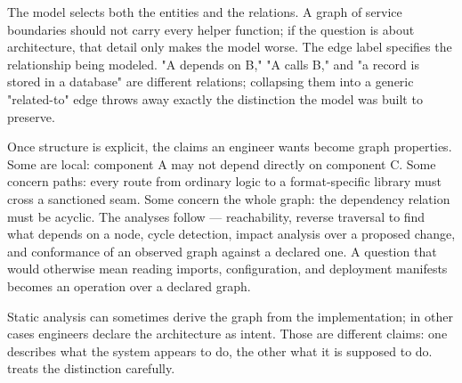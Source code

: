 
The model selects both the entities and the relations. A graph of service boundaries should not carry every helper function; if the question is about architecture, that detail only makes the model worse. The edge label specifies the relationship being modeled. "A depends on B," "A calls B," and "a record is stored in a database" are different relations; collapsing them into a generic "related-to" edge throws away exactly the distinction the model was built to preserve.


Once structure is explicit, the claims an engineer wants become graph properties. Some are local: component A may not depend directly on component C. Some concern paths: every route from ordinary logic to a format-specific library must cross a sanctioned seam. Some concern the whole graph: the dependency relation must be acyclic. The analyses follow --- reachability, reverse traversal to find what depends on a node, cycle detection, impact analysis over a proposed change, and conformance of an observed graph against a declared one. A question that would otherwise mean reading imports, configuration, and deployment manifests becomes an operation over a declared graph.


Static analysis can sometimes derive the graph from the implementation; in other cases engineers declare the architecture as intent. Those are different claims: one describes what the system appears to do, the other what it is supposed to do.  treats the distinction carefully.

